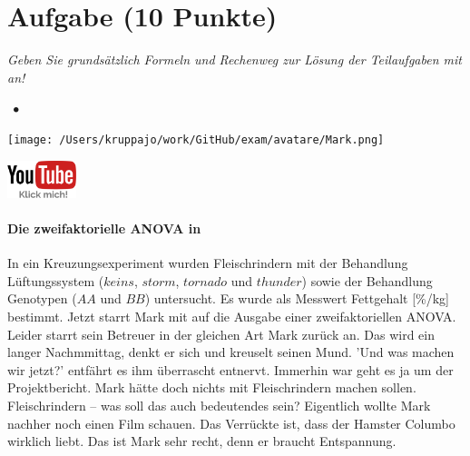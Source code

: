 \documentclass[a4paper, 9pt]{scrartcl}\usepackage[]{graphicx}\usepackage[]{xcolor}
\begin{document}
\clearpage

\section{Aufgabe \hfill (10 Punkte)}

\textit{Geben Sie grundsätzlich Formeln und Rechenweg zur Lösung der Teilaufgaben mit an!} \\[1Ex]
 

 
\ifcollection
\begin{flushright}
\tiny\vspace{-3Ex}
\textbf{\examinhaltstart}
\exammodulestatversuch $\;\bullet$
\exammodulebiostat
\vspace{-4Ex}
\end{flushright}
\begin{minipage}[t]{0.5\textwidth}
\texttt{[image: /Users/kruppajo/work/GitHub/exam/avatare/Mark.png]}
\end{minipage}
\begin{minipage}[t]{0.5\textwidth}
\hfill
\href{https://youtu.be/rWTyHXXlYjY}{\includegraphics[width = 2cm]{img/youtube}}
\end{minipage}
\vspace{-3Ex}
\fi



\ifcollection
\paragraph{Die zweifaktorielle ANOVA in \Rlogo}
\fi

In ein Kreuzungsexperiment wurden Fleischrindern mit der Behandlung Lüftungssystem ($keins$, $storm$, $tornado$ und $thunder$) sowie der Behandlung Genotypen ($AA$ und $BB$) untersucht. Es wurde als Messwert Fettgehalt [\%/kg] bestimmt. Jetzt starrt Mark mit auf die \Rlogo Ausgabe einer zweifaktoriellen ANOVA. Leider starrt sein Betreuer in der gleichen Art Mark zurück an. Das wird ein langer Nachmmittag, denkt er sich und kreuselt seinen Mund. 'Und was machen wir jetzt?' entfährt es ihm überrascht entnervt. Immerhin war geht es ja um der Projektbericht. Mark hätte doch nichts mit Fleischrindern machen sollen. Fleischrindern -- was soll das auch bedeutendes sein? Eigentlich wollte Mark nachher noch einen Film schauen. Das Verrückte ist, dass der Hamster Columbo wirklich liebt. Das ist Mark sehr recht, denn er braucht Entspannung.
\end{document}
